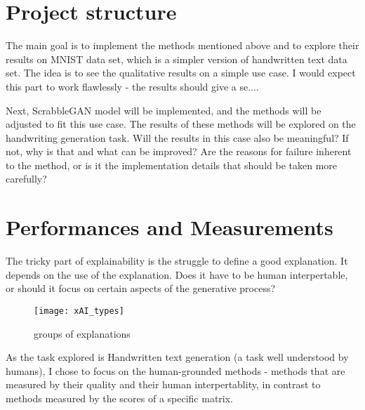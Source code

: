 \section{Project structure}

The main goal is to implement the methods mentioned above and to explore their results on MNIST data set, which is a simpler version of handwritten text data set. The idea is to see the qualitative results on a simple use case.
I would expect this part to work flawlessly - the results should give a se....

Next, ScrabbleGAN model will be implemented, and the methods will be adjusted to fit this use case. The results of these methods will be explored on the handwriting generation task. Will the results in this case also be  meaningful? If not, why is that and what can be improved? Are the reasons for failure inherent to the method, or is it the implementation details that should be taken more carefully?

\section{Performances and Measurements}

The tricky part of explainability is the struggle to define a good explanation. It depends on the use of the explanation. Does it have to be human interpertable, or should it focus on certain aspects of the generative process? 

\begin{figure}[h]
\centering
\texttt{[image: xAI\_types]}
\caption{groups of explanations \cite{13}}
\label{fig:x cubed graph}
\end{figure}


As the task explored is Handwritten text generation (a task well understood by humans), I chose to focus on the human-grounded methods - methods that are measured by their quality and their human interpertablity, in contrast to methods measured by the scores of a specific matrix.

